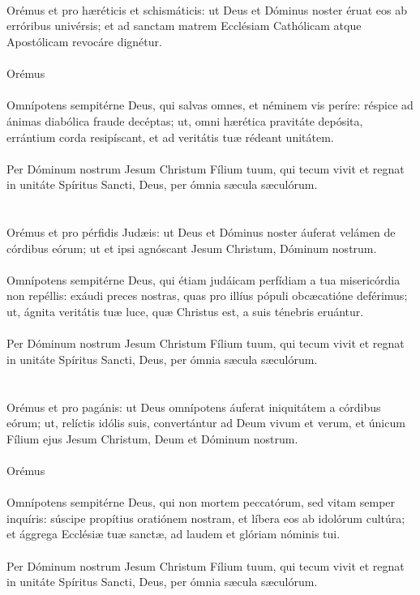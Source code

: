 \documentclass[12pt, a4paper]{article}
\begin{document}
	\\\\
	\\
	Orémus et pro hæréticis et schismáticis: ut Deus et Dóminus noster éruat eos ab erróribus univérsis; et ad sanctam matrem Ecclésiam Cathólicam atque Apostólicam revocáre dignétur.
	\\\\
	Orémus
	\\
	\\
	Omnípotens sempitérne Deus, qui salvas omnes, et néminem vis períre: réspice ad ánimas diabólica fraude decéptas; ut, omni hærética pravitáte depósita, errántium corda resipíscant, et ad veritátis tuæ rédeant unitátem.
	\\\\
	Per Dóminum nostrum Jesum Christum Fílium tuum, qui tecum vivit et regnat in unitáte Spíritus Sancti, Deus, per ómnia sæcula sæculórum.
	\\\\
	\\
	Orémus et pro pérfidis Judæis: ut Deus et Dóminus noster áuferat velámen de córdibus eórum; ut et ipsi agnóscant Jesum Christum, Dóminum nostrum.
	\\\\
	Omnípotens sempitérne Deus, qui étiam judáicam perfídiam a tua misericórdia non repéllis: exáudi preces nostras, quas pro illíus pópuli obcæcatióne deférimus; ut, ágnita veritátis tuæ luce, quæ Christus est, a suis ténebris eruántur.
	\\\\
	Per Dóminum nostrum Jesum Christum Fílium tuum, qui tecum vivit et regnat in unitáte Spíritus Sancti, Deus, per ómnia sæcula sæculórum.
	\\\\
	\\
	Orémus et pro pagánis: ut Deus omnípotens áuferat iniquitátem a córdibus eórum; ut, relíctis idólis suis, convertántur ad Deum vivum et verum, et únicum Fílium ejus Jesum Christum, Deum et Dóminum nostrum.
	\\\\
	Orémus
	\\
	\\
	Omnípotens sempitérne Deus, qui non mortem peccatórum, sed vitam semper inquíris: súscipe propítius oratiónem nostram, et líbera eos ab idolórum cultúra; et ággrega Ecclésiæ tuæ sanctæ, ad laudem et glóriam nóminis tui.
	\\\\
	Per Dóminum nostrum Jesum Christum Fílium tuum, qui tecum vivit et regnat in unitáte Spíritus Sancti, Deus, per ómnia sæcula sæculórum.
	\\\\
	
\end{document}
